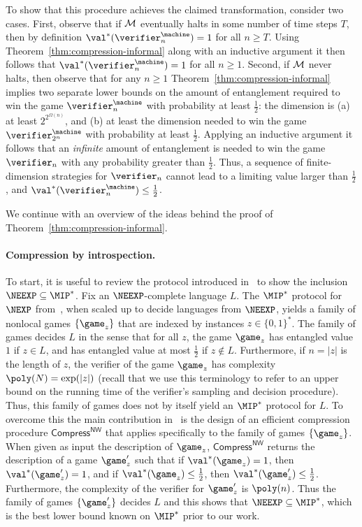 To show that this procedure achieves the claimed transformation, consider two cases. First, observe that if $\cal{M}$ eventually halts in some number of time steps $T$, then by definition $\val^*(\verifier^\machine_n) = 1$ for all $n\geq T$. Using Theorem~\ref{thm:compression-informal} along with an inductive argument it then follows that $\val^*(\verifier^\machine_n) = 1$ for all $n \geq 1$. Second, if $\cal{M}$ never halts, then observe that for any $n\geq 1$ Theorem~\ref{thm:compression-informal} implies two separate lower bounds on the amount of entanglement required to win the game $\verifier^\machine_n$ with probability at least $\frac{1}{2}$: the dimension is (a) at least $2^{2^{\Omega(n)}}$, and (b) at least the dimension needed to win the game $\verifier^\machine_{2^n}$ with probability at least $\frac{1}{2}$. Applying an inductive argument it follows that an \emph{infinite} amount of entanglement is needed to win the game $\verifier_n$ with any probability greater than $\frac{1}{2}$. Thus, a sequence of finite-dimension strategies for $\verifier_n$ cannot lead to a limiting value larger than $\frac{1}{2}$, and $\val^*(\verifier^\machine_n) \leq \frac{1}{2}$. 

We continue with an overview of the ideas behind the proof of Theorem~\ref{thm:compression-informal}.

\newcommand{\CompressNW}{\mathsf{Compress}^{\mathsf{NW}}}
 
\paragraph{Compression by introspection.}
To start, it is useful to review the protocol introduced in~\cite{NW19} to show
the inclusion $\NEEXP \subseteq \MIP^*$.
Fix an $\NEEXP$-complete language $L$.
The $\MIP^*$ protocol for $\NEXP$ from~\cite{natarajan2018two}, when scaled up
to decide languages from $\NEEXP$, yields a family of nonlocal games $\{ \game_z
\}$ that are indexed by instances $z \in \{0,1\}^*$.
The family of games decides $L$ in the sense that for all $z$, the game
$\game_z$ has entangled value $1$ if $z \in L$, and has entangled value at most
$\frac{1}{2}$ if $z \notin L$.
Furthermore, if $n = |z|$ is the length of $z$, the verifier of the game
$\game_z$ has complexity $\poly(N)=\exp(|z|)$ (recall that we use this
terminology to refer to an upper bound on the running time of the verifier's
sampling and decision procedure).
Thus, this family of games does not by itself yield an $\MIP^*$ protocol for
$L$.
To overcome this the main contribution in~\cite{NW19} is the design of an
efficient compression procedure $\CompressNW$ that applies specifically to the
family of games $\{\game_z \}$.
When given as input the description of $\game_z$, $\CompressNW$ returns the
description of a game $\game_z'$ such that if $\val^*(\game_z) = 1$, then
$\val^*(\game_z') = 1$, and if $\val^*(\game_z) \leq \frac{1}{2}$, then
$\val^*(\game_z') \leq \frac{1}{2}$.
Furthermore, the complexity of the verifier for $\game_z'$ is $\poly(n)$.
Thus the family of games $\{ \game_z' \}$ decides $L$ and this shows that
$\NEEXP \subseteq \MIP^*$, which is the best lower bound known on $\MIP^*$
prior to our work.
  

